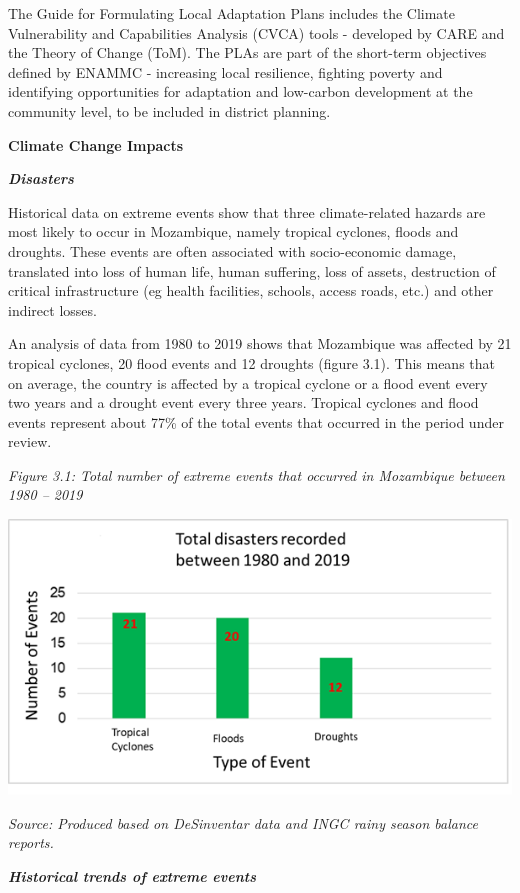 \documentclass[
]{book}
\begin{document}
The Guide for Formulating Local Adaptation Plans includes the Climate Vulnerability and Capabilities Analysis (CVCA) tools - developed by CARE and the Theory of Change (ToM). The PLAs are part of the short-term objectives defined by ENAMMC - increasing local resilience, fighting poverty and identifying opportunities for adaptation and low-carbon development at the community level, to be included in district planning.

\textbf{Climate Change Impacts}

\textbf{\emph{Disasters}}

Historical data on extreme events show that three climate-related hazards are most likely to occur in Mozambique, namely tropical cyclones, floods and droughts. These events are often associated with socio-economic damage, translated into loss of human life, human suffering, loss of assets, destruction of critical infrastructure (eg health facilities, schools, access roads, etc.) and other indirect losses.

An analysis of data from 1980 to 2019 shows that Mozambique was affected by 21 tropical cyclones, 20 flood events and 12 droughts (figure 3.1). This means that on average, the country is affected by a tropical cyclone or a flood event every two years and a drought event every three years. Tropical cyclones and flood events represent about 77\% of the total events that occurred in the period under review.

\emph{Figure 3.1: Total number of extreme events that occurred in Mozambique between 1980 -- 2019 }

\includegraphics{Figure22.png}

\emph{Source: Produced based on DeSinventar data and INGC rainy season balance reports.}

\textbf{\emph{Historical trends of extreme events}}
\end{document}
